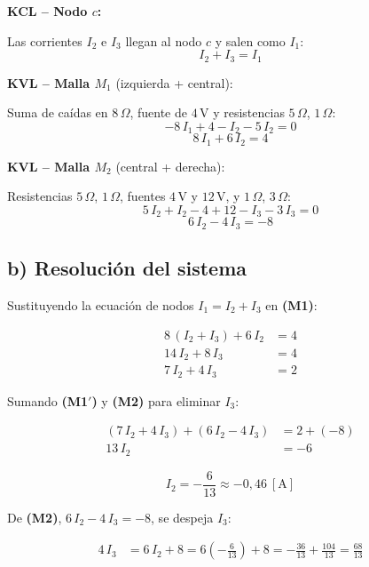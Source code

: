 \documentclass[12pt,letterpaper]{article}
\begin{document}
\hfill
\begin{minipage}[t]{0.56\textwidth}
\vspace{6pt}

\textbf{KCL -- Nodo $c$:}

Las corrientes $I_2$ e $I_3$ llegan al nodo $c$ y salen como $I_1$:
\[
    \boxed{I_2 + I_3 = I_1} \tag{N}
\]

\medskip
\textbf{KVL -- Malla $M_1$} (izquierda + central):

Suma de ca\'idas en $8\,\Omega$, fuente de $4\,$V y resistencias $5\,\Omega$, $1\,\Omega$:
\[
    -8\,I_1 + 4 - I_2 - 5\,I_2 = 0
\]
\[
    \boxed{8\,I_1 + 6\,I_2 = 4} \tag{M1}
\]

\medskip
\textbf{KVL -- Malla $M_2$} (central + derecha):

Resistencias $5\,\Omega$, $1\,\Omega$, fuentes $4\,$V y $12\,$V, y $1\,\Omega$, $3\,\Omega$:
\[
    5\,I_2 + I_2 - 4 + 12 - I_3 - 3\,I_3 = 0
\]
\[
    \boxed{6\,I_2 - 4\,I_3 = -8} \tag{M2}
\]
\end{minipage}

\newpage

\subsection*{b) Resoluci\'on del sistema}

Sustituyendo la ecuaci\'on de nodos $I_1 = I_2 + I_3$ en \textbf{(M1)}:

\begin{align*}
    8\,(I_2 + I_3) + 6\,I_2 &= 4 \\
    14\,I_2 + 8\,I_3 &= 4 \\
    7\,I_2 + 4\,I_3 &= 2 \tag{M1$'$}
\end{align*}

Sumando \textbf{(M1$'$)} y \textbf{(M2)} para eliminar $I_3$:

\begin{align*}
    (7\,I_2 + 4\,I_3) + (6\,I_2 - 4\,I_3) &= 2 + (-8) \\
    13\,I_2 &= -6
\end{align*}

\[
    \boxed{I_2 = -\frac{6}{13} \approx -0{,}46\ [\text{A}]}
\]

De \textbf{(M2)}, $6\,I_2 - 4\,I_3 = -8$, se despeja $I_3$:

\begin{align*}
    4\,I_3 &= 6\,I_2 + 8 = 6\left(-\frac{6}{13}\right) + 8 = -\frac{36}{13} + \frac{104}{13} = \frac{68}{13}
\end{align*}
\end{document}
